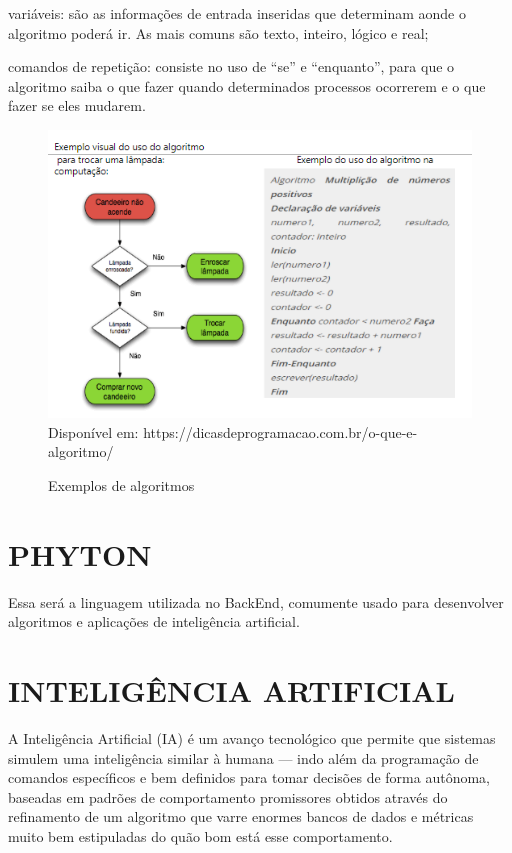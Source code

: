 \begin{description}
	\setlength\itemindent{15pt}
	\item[•] variáveis: são as informações de entrada inseridas que determinam aonde o algoritmo poderá ir. As mais comuns são texto, inteiro, lógico e real; 
	\item[•] comandos de repetição: consiste no uso de “se” e “enquanto”, para que o algoritmo saiba o que fazer quando determinados processos ocorrerem e o que fazer se eles mudarem. 
\end{description}

\begin{figure}[H]
	\centering
	\caption{Exemplos de algoritmos}
	\centering
	\includegraphics{./images/Figure_7}	
	\label{fig:Fig7}
	\centering
	\\Disponível em: https://dicasdeprogramacao.com.br/o-que-e-algoritmo/  
\end{figure}

\section{PHYTON}
\label{sec:PHYTON}
Essa será a linguagem utilizada no BackEnd, comumente usado para desenvolver algoritmos e aplicações de inteligência artificial. 

\section{INTELIGÊNCIA ARTIFICIAL}
\label{sec:inteligênciaartificial}

A Inteligência Artificial (IA) é um avanço tecnológico que permite que sistemas simulem uma inteligência similar à humana — indo além da programação de comandos específicos e bem definidos para tomar decisões de forma autônoma, baseadas em padrões de comportamento promissores obtidos através do refinamento de um algoritmo que varre enormes bancos de dados e métricas muito bem estipuladas do quão bom está esse comportamento. 

